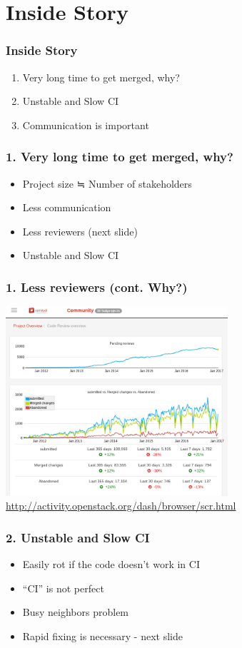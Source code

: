 \documentclass[aspectratio=169,11pt,hyperref={colorlinks=true}]{beamer}
\begin{document}
\section{Inside Story}
\begin{frame}
  \frametitle{Inside Story}
  \begin{enumerate}
    \item Very long time to get merged, why?
    \item Unstable and Slow CI
    \item Communication is important
  \end{enumerate}
\end{frame}

\begin{frame}
  \frametitle{1. Very long time to get merged, why?}
  \begin{itemize}
    \item Project size ≒ Number of stakeholders
    \item Less communication
    \item Less reviewers (next slide)
    \item Unstable and Slow CI
  \end{itemize}
\end{frame}

\begin{frame}
  \frametitle{1. Less reviewers (cont. Why?)}
  \centering\includegraphics[height=70mm]{images/project-overview.png}
  \url{http://activity.openstack.org/dash/browser/scr.html}
\end{frame}

\begin{frame}
  \frametitle{2. Unstable and Slow CI}
  \begin{itemize}
    \item Easily rot if the code doesn't work in CI
    \item ``CI'' is not perfect
    \item Busy neighbors problem
    \item Rapid fixing is necessary - next slide
  \end{itemize}
\end{frame}
\end{document}
